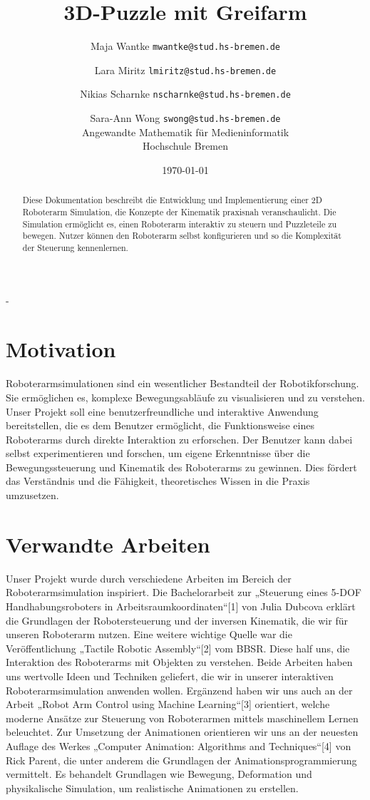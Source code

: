 \documentclass[12pt]{article}
\title{%
    3D-Puzzle mit Greifarm}
\author{
    Maja Wantke \texttt{mwantke@stud.hs-bremen.de} \and
    Lara Miritz \texttt{lmiritz@stud.hs-bremen.de} \and
    Nikias Scharnke \texttt{nscharnke@stud.hs-bremen.de} \and
    Sara-Ann Wong \texttt{swong@stud.hs-bremen.de} \\
    Angewandte Mathematik für Medieninformatik \\
    Hochschule Bremen}
\date{ \today}
\begin{document}
    \maketitle

    \begin{abstract}
        Diese Dokumentation beschreibt die Entwicklung und Implementierung einer 2D Roboterarm Simulation,
        die Konzepte der Kinematik praxisnah veranschaulicht. Die Simulation ermöglicht es, einen Roboterarm
        interaktiv zu steuern und Puzzleteile zu bewegen. Nutzer können den Roboterarm selbst konfigurieren
        und so die Komplexität der Steuerung kennenlernen.
    \end{abstract}
    \clearpage
    \tableofcontents
    \clearpage
    \listoffigures
    \clearpage-


    \section{Motivation}
    Roboterarmsimulationen sind ein wesentlicher Bestandteil der Robotikforschung. Sie ermöglichen es,
    komplexe Bewegungsabläufe zu visualisieren und zu verstehen. Unser Projekt soll eine benutzerfreundliche
    und interaktive Anwendung bereitstellen, die es dem Benutzer ermöglicht, die Funktionsweise eines
    Roboterarms durch direkte Interaktion zu erforschen. Der Benutzer kann dabei selbst experimentieren
    und forschen, um eigene Erkenntnisse über die Bewegungssteuerung und Kinematik des Roboterarms zu gewinnen.
    Dies fördert das Verständnis und die Fähigkeit, theoretisches Wissen in die Praxis umzusetzen.


    \section{Verwandte Arbeiten}
    Unser Projekt wurde durch verschiedene Arbeiten im Bereich der Roboterarmsimulation inspiriert.
    Die Bachelorarbeit zur „Steuerung eines 5-DOF Handhabungsroboters in Arbeitsraumkoordinaten“[1] von Julia
    Dubcova erklärt die Grundlagen der Robotersteuerung und der inversen Kinematik, die wir für unseren
    Roboterarm nutzen. Eine weitere wichtige Quelle war die Veröffentlichung „Tactile Robotic Assembly“[2]
    vom BBSR. Diese half uns, die Interaktion des Roboterarms mit Objekten zu verstehen. Beide Arbeiten haben
    uns wertvolle Ideen und Techniken geliefert, die wir in unserer interaktiven Roboterarmsimulation anwenden
    wollen. Ergänzend haben wir uns auch an der Arbeit „Robot Arm Control using Machine Learning“[3] orientiert,
    welche moderne Ansätze zur Steuerung von Roboterarmen mittels maschinellem Lernen beleuchtet. Zur Umsetzung
    der Animationen orientieren wir uns an der neuesten Auflage des Werkes „Computer Animation: Algorithms and
    Techniques“[4] von Rick Parent, die unter anderem die Grundlagen der Animationsprogrammierung vermittelt.
    Es behandelt Grundlagen wie Bewegung, Deformation und physikalische Simulation, um realistische Animationen
    zu erstellen.
\end{document}
